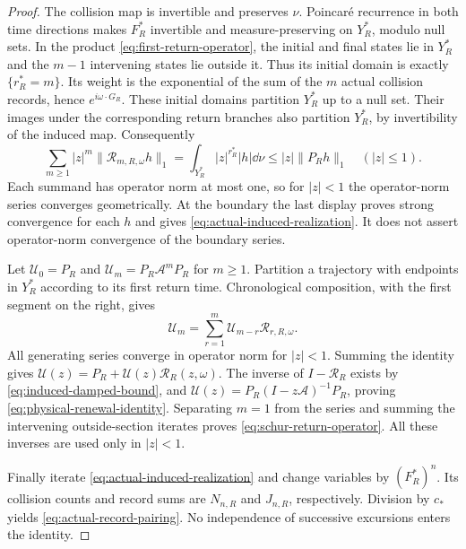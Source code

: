 \begin{proof}
The collision map is invertible and preserves $\nu$. Poincar\'e
recurrence in both time directions makes $F_R^*$ invertible and
measure-preserving on $Y_R^*$, modulo null sets. In the product
\eqref{eq:first-return-operator}, the initial and final states lie in
$Y_R^*$ and the $m-1$ intervening states lie outside it. Thus its initial
domain is exactly $\{r_R^*=m\}$. Its weight is the exponential of the
sum of the $m$ actual collision records, hence $e^{i\omega\cdot G_R}$.
These initial domains partition $Y_R^*$ up to a null set. Their images
under the corresponding return branches also partition $Y_R^*$, by
invertibility of the induced map. Consequently
\[
 \sum_{m\ge1}|z|^m\|\mathcal R_{m,R,\omega}h\|_1
       =\int_{Y_R^*}|z|^{r_R^*}|h|\dd\nu
       \le |z|\|P_Rh\|_1 \quad (|z|\le1).
\]
Each summand has operator norm at most one, so for $|z|<1$ the
operator-norm series converges geometrically. At the boundary the last
display proves strong convergence for each $h$ and gives
\eqref{eq:actual-induced-realization}. It does not assert operator-norm
convergence of the boundary series.

Let $\mathcal U_0=P_R$ and $\mathcal U_m=P_R\mathcal A^mP_R$ for
$m\ge1$. Partition a trajectory with endpoints in $Y_R^*$ according to
its first return time. Chronological composition, with the first segment
on the right, gives
\[
 \mathcal U_m=\sum_{r=1}^m\mathcal U_{m-r}\mathcal R_{r,R,\omega}.
\]
All generating series converge in operator norm for $|z|<1$. Summing
the identity gives $\mathcal U(z)=P_R+\mathcal U(z)\mathcal R_R(z,\omega)$.
The inverse of $I-\mathcal R_R$ exists by
\eqref{eq:induced-damped-bound}, and
$\mathcal U(z)=P_R(I-z\mathcal A)^{-1}P_R$, proving
\eqref{eq:physical-renewal-identity}. Separating $m=1$ from the series
and summing the intervening outside-section iterates proves
\eqref{eq:schur-return-operator}. All these inverses are used only in
$|z|<1$.

Finally iterate \eqref{eq:actual-induced-realization} and change
variables by $(F_R^*)^n$. Its collision counts and record sums are
$N_{n,R}$ and $J_{n,R}$, respectively. Division by $c_*$ yields
\eqref{eq:actual-record-pairing}. No independence of successive
excursions enters the identity.
\end{proof}

